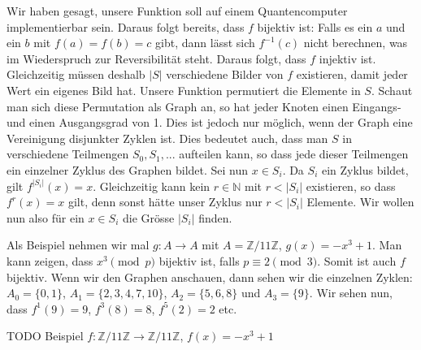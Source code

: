 Wir haben gesagt, unsere Funktion soll auf einem Quantencomputer implementierbar sein. Daraus folgt bereits, dass $f$ bijektiv ist: Falls es ein $a$ und ein $b$ mit $f(a) = f(b) = c$ gibt, dann lässt sich $f^{-1}(c)$ nicht berechnen, was im Wiederspruch zur Reversibilität steht. Daraus folgt, dass $f$ injektiv ist. Gleichzeitig müssen deshalb $|S|$ verschiedene Bilder von $f$ existieren, damit jeder Wert ein eigenes Bild hat. Unsere Funktion permutiert die Elemente in $S$. Schaut man sich diese Permutation als Graph an, so hat jeder Knoten einen Eingangs- und einen Ausgangsgrad von 1. Dies ist jedoch nur möglich, wenn der Graph eine Vereinigung disjunkter Zyklen ist.
Dies bedeutet auch, dass man $S$ in verschiedene Teilmengen $S_0, S_1, ...$ aufteilen kann, so dass jede dieser Teilmengen ein einzelner Zyklus des Graphen bildet.
Sei nun $x \in S_i$. Da $S_i$ ein Zyklus bildet, gilt $f^{|S_i|}(x) = x$. Gleichzeitig kann kein $r \in \mathbb{N}$ mit $r < |S_i|$ existieren, so dass $f^r(x) = x$ gilt, denn sonst hätte unser Zyklus nur $r < |S_i|$ Elemente. Wir wollen nun also für ein $x \in S_i$ die Grösse $|S_i|$ finden.

Als Beispiel nehmen wir mal $g : A \rightarrow A$ mit $A = \mathbb{Z}/11\mathbb{Z}$, $g(x) = -x^3 + 1$. Man kann zeigen, dass $x^3 \pmod{p}$ bijektiv ist, falls $p \equiv 2 \pmod 3$. Somit ist auch $f$ bijektiv. Wenn wir den Graphen anschauen, dann sehen wir die einzelnen Zyklen: $A_0 = \{0, 1\}$, $A_1 = \{2, 3, 4, 7, 10\}$, $A_2 = \{5, 6, 8\}$ und $A_3 = \{9\}$. Wir sehen nun, dass $f^1(9) = 9$, $f^3(8) = 8$, $f^5(2) = 2$ etc. 

TODO Beispiel $f : \mathbb{Z} / 11 \mathbb{Z} \rightarrow \mathbb{Z} / 11 \mathbb{Z} $, $f(x) = -x^3 + 1$


